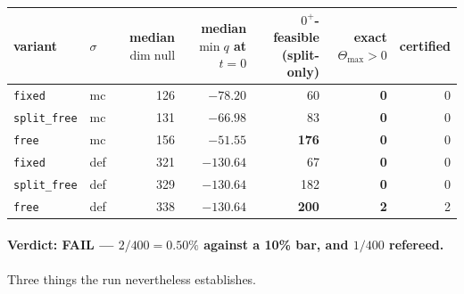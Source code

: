 \documentclass[11pt,a4paper]{article}
\theoremstyle{definition}
\newcommand{\Tmax}{\Theta_{\max}}
\begin{document}
\begin{center}
\small
\begin{tabular}{@{}llrrrrr@{}}
\toprule
variant & $\sigma$ & median $\dim\mathrm{null}$ & median $\min q$ at $t{=}0$ & $0^+$-feasible (split-only) & \textbf{exact $\Tmax>0$} & certified \\
\midrule
\texttt{fixed} & mc & 126 & $-78.20$ & 60 & \textbf{0} & 0 \\
\texttt{split\_free} & mc & 131 & $-66.98$ & 83 & \textbf{0} & 0 \\
\texttt{free} & mc & 156 & $-51.55$ & \textbf{176} & \textbf{0} & 0 \\
\texttt{fixed} & def & 321 & $-130.64$ & 67 & \textbf{0} & 0 \\
\texttt{split\_free} & def & 329 & $-130.64$ & 182 & \textbf{0} & 0 \\
\texttt{free} & def & 338 & $-130.64$ & \textbf{200} & \textbf{2} & 2 \\
\bottomrule
\end{tabular}
\end{center}

\paragraph{Verdict: FAIL --- $2/400 = 0.50\%$ against a 10\% bar, and $1/400$ refereed.}
Three things the run nevertheless establishes.
\end{document}
